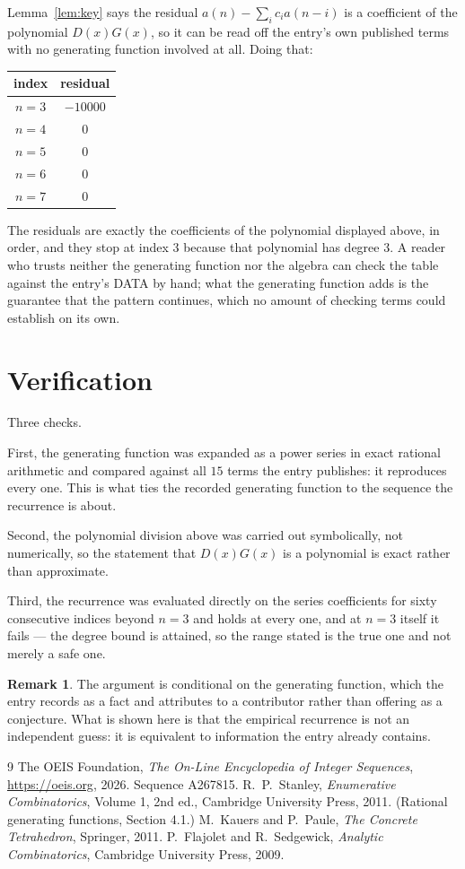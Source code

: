 \documentclass[11pt,a4paper]{article}
\theoremstyle{plain}
\theoremstyle{definition}
\newtheorem{remark}[theorem]{Remark}
\begin{document}
Lemma~\ref{lem:key} says the residual $a(n)-\sum_ic_ia(n-i)$ is a coefficient of the
polynomial $D(x)G(x)$, so it can be read off the entry's own published terms with no
generating function involved at all. Doing that:
\begin{center}
\begin{tabular}{cc}
index & residual \\ \hline
$n=3$ & $-10000$ \\
$n=4$ & $0$ \\
$n=5$ & $0$ \\
$n=6$ & $0$ \\
$n=7$ & $0$
\end{tabular}
\end{center}
The residuals are exactly the coefficients of the polynomial displayed above, in order, and
they stop at index $3$ because that polynomial has degree $3$. A reader who trusts
neither the generating function nor the algebra can check the table against the entry's DATA
by hand; what the generating function adds is the guarantee that the pattern continues, which
no amount of checking terms could establish on its own.

\section{Verification}

Three checks.

First, the generating function was expanded as a power series in exact rational arithmetic and
compared against all $15$ terms the entry publishes: it reproduces every one. This is
what ties the recorded generating function to the sequence the recurrence is about.

Second, the polynomial division above was carried out symbolically, not numerically, so the
statement that $D(x)G(x)$ is a polynomial is exact rather than approximate.

Third, the recurrence was evaluated directly on the series coefficients for sixty consecutive
indices beyond $n=3$ and holds at every one, and at $n=3$ itself it fails --- the
degree bound is attained, so the range stated is the true one and not merely a safe one.

\begin{remark}
The argument is conditional on the generating function, which the entry records as a fact and
attributes to a contributor rather than offering as a conjecture. What is shown here is that
the empirical recurrence is not an independent guess: it is equivalent to information the
entry already contains.
\end{remark}

\begin{thebibliography}{9}
 The OEIS Foundation, \emph{The On-Line Encyclopedia of Integer
Sequences}, \url{https://oeis.org}, 2026. Sequence A267815.
 R.~P.~Stanley, \emph{Enumerative Combinatorics}, Volume 1, 2nd ed.,
Cambridge University Press, 2011. (Rational generating functions, Section 4.1.)
 M.~Kauers and P.~Paule, \emph{The Concrete Tetrahedron}, Springer, 2011.
 P.~Flajolet and R.~Sedgewick, \emph{Analytic Combinatorics}, Cambridge
University Press, 2009.
\end{thebibliography}
\end{document}

